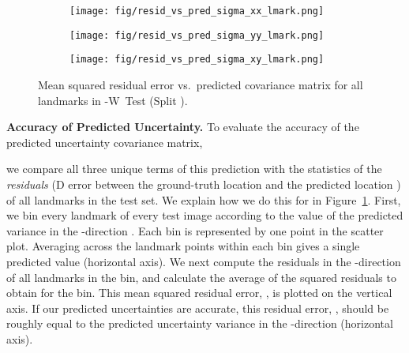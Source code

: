 \documentclass[10pt,twocolumn,letterpaper]{article}
\newcommand{\threehundredW}{-W}
\newcommand{\1}{{\bf 1}}
\newcommand{\0}{{\bf 0}}
\begin{document}
        \begin{figure}[!tb]
            \centering
        	\begin{subfigure}{0.325\linewidth}
        		\texttt{[image: fig/resid\_vs\_pred\_sigma\_xx\_lmark.png]}
        		\vspace{-5mm}
        		\label{fig:res_vs_pred_x}
        	\end{subfigure}\hfill
        	\begin{subfigure}{0.325\linewidth}
        		\texttt{[image: fig/resid\_vs\_pred\_sigma\_yy\_lmark.png]}
        			\vspace{-5mm}
        		\label{fig:res_vs_pred_y}
        	\end{subfigure}
        	\hfill
        	\begin{subfigure}{0.325\linewidth}
        		\texttt{[image: fig/resid\_vs\_pred\_sigma\_xy\_lmark.png]}
        			\vspace{-5mm}
        		\label{fig:res_vs_pred_xy}
        	\end{subfigure}
        	\vspace{-0.3cm}
        	\caption{Mean squared residual error vs.~predicted covariance matrix for all landmarks in \threehundredW~Test (Split ).}
        	\label{fig:res_vs_pred}
    	    \vspace{-0.3cm}
        \end{figure}

\textbf{Accuracy of Predicted Uncertainty.}
        To evaluate the accuracy of the predicted uncertainty covariance matrix, 
        
        we compare all three unique terms of this prediction with the statistics of the {\it residuals} (D error between the ground-truth location  and the predicted location ) of all landmarks in the test set. We explain how we do this for  in Figure~\ref{fig:res_vs_pred_x}. First, we bin every landmark of every test image according to the value of the predicted variance in the -direction . Each bin is represented by one point in the scatter plot. Averaging  across the  landmark points within each bin gives a single predicted   value (horizontal axis). We next compute the residuals in the -direction of all landmarks in the bin, and calculate the average of the squared residuals to obtain  for the bin. This mean squared residual error, , is plotted on the vertical axis. If our predicted uncertainties are accurate, this residual error, , should be roughly equal to the predicted uncertainty variance in the -direction (horizontal axis).
        
\end{document}
